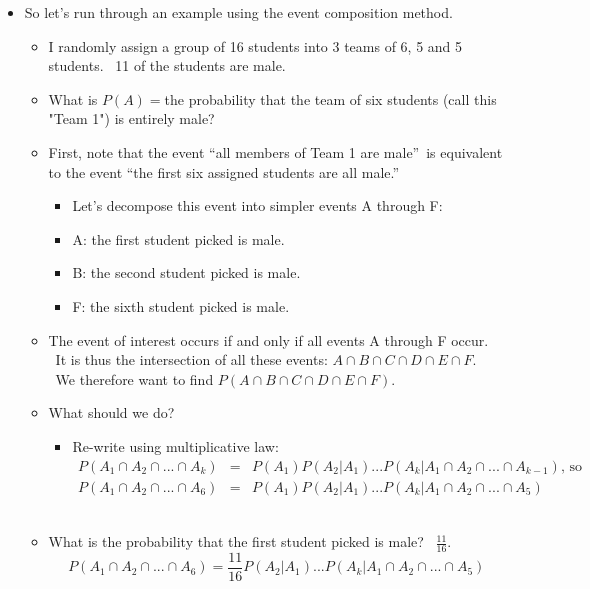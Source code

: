\documentclass[11pt]{article}
\begin{document}
\begin{itemize}
\item So let's run through an example using the event composition method.

\begin{itemize}
\item I randomly assign a group of 16 students into 3 teams of 6, 5 and 5
students. \ 11 of the students are male.

\item What is $P\left( A\right) =$the probability that the team of six
students (call this "Team 1") is entirely male?

\item First, note that the event \textquotedblleft all members of Team 1 are
male\textquotedblright\ is equivalent to the event \textquotedblleft the
first six assigned students are all male.\textquotedblright

\begin{itemize}
\item Let's decompose this event into simpler events A through F:

\item A: the first student picked is male.

\item B: the second student picked is male.

\item F: the sixth student picked is male.
\end{itemize}

\item The event of interest occurs if and only if all events A through F
occur. \ It is thus the intersection of all these events: $A\cap B\cap C\cap
D\cap E\cap F.$ \ We therefore want to find $P(A\cap B\cap C\cap D\cap E\cap
F).$

\item What should we do?

\begin{itemize}
\item Re-write using multiplicative law:%
\begin{eqnarray*}
P(A_{1}\cap A_{2}\cap ...\cap A_{k})
&=&P(A_{1})P(A_{2}|A_{1})...P(A_{k}|A_{1}\cap A_{2}\cap ...\cap A_{k-1})%
\text{, so} \\
P(A_{1}\cap A_{2}\cap ...\cap A_{6})
&=&P(A_{1})P(A_{2}|A_{1})...P(A_{k}|A_{1}\cap A_{2}\cap ...\cap A_{5})
\end{eqnarray*}%
\ 
\end{itemize}

\item What is the probability that the first student picked is male? \ $%
\frac{11}{16}.$%
\begin{equation*}
P(A_{1}\cap A_{2}\cap ...\cap A_{6})=\frac{11}{16}%
P(A_{2}|A_{1})...P(A_{k}|A_{1}\cap A_{2}\cap ...\cap A_{5})
\end{equation*}


\end{itemize}
\end{itemize}
\end{document}
